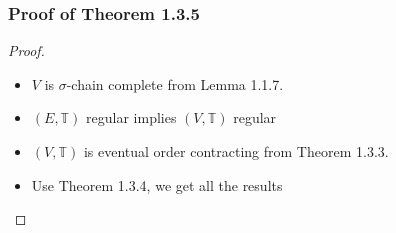 \documentclass[11pt,xcolor={dvipsnames},hyperref={pdftex,pdfpagemode=UseNone,hidelinks,pdfdisplaydoctitle=true},usepdftitle=false]{beamer}
\begin{document}
\begin{frame}
\frametitle{Proof of Theorem 1.3.5}
\begin{proof}
\begin{itemize}
\item $V$ is $\sigma$-chain complete from Lemma 1.1.7.
\item $(E,\mathbb{T})$ regular implies $(V,\mathbb{T})$ regular

\item $(V,\mathbb{T})$ is eventual order contracting from Theorem 1.3.3.

\item Use Theorem 1.3.4, we get all the results
\end{itemize}
\end{proof}
\end{frame}
\end{document}
